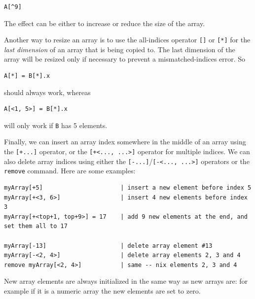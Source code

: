 \documentclass{article}
\newenvironment{code}{
       \begin{list}{}{
               \setlength{\leftmargin}{.4in}
               \setlength{\rightmargin}{0in}
               \setlength{\topsep}{.2in}
       }
       \small
       \item[] }
       { \end{list}   }
\begin{document}
\begin{code} \begin{verbatim}
A[^9]
\end{verbatim} \end{code}

\noindent The effect can be either to increase or reduce the size of the array.

Another way to resize an array is to use the all-indices operator \verb#[]# or \verb#[*]# for the \emph{last dimension} of an array that is being copied to.  The last dimension of the array will be resized only if necessary to prevent a mismatched-indices error.  So

\begin{code} \begin{verbatim}
A[*] = B[*].x
\end{verbatim} \end{code}

\noindent should always work, whereas

\begin{code} \begin{verbatim}
A[<1, 5>] = B[*].x
\end{verbatim} \end{code}

\noindent will only work if \verb#B# has 5 elements.

Finally, we can insert an array index somewhere in the middle of an array using the \verb#[+...]# operator, or the \verb#[+<..., ...>]# operator for multiple indices.  We can also delete array indices using either the \verb#[-...]#/\verb#[-<..., ...>]# operators or the \verb#remove# command.  Here are some examples:

\begin{code} \begin{verbatim}
myArray[+5]                      | insert a new element before index 5
myArray[+<3, 6>]                 | insert 4 new elements before index 3
myArray[+<top+1, top+9>] = 17    | add 9 new elements at the end, and set them all to 17

myArray[-13]                     | delete array element #13
myArray[-<2, 4>]                 | delete array elements 2, 3 and 4
remove myArray[<2, 4>]           | same -- nix elements 2, 3 and 4
\end{verbatim} \end{code}

\noindent New array elements are always initialized in the same way as new arrays are:  for example if it is a numeric array the new elements are set to zero.
\end{document}
